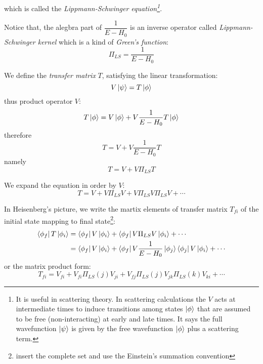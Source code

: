\documentclass[12pt,openany]{book}
\begin{document}
	which is called the \textit{Lippmann-Schwinger equation\footnote{It is useful in scattering theory. In scattering calculations the $V$ acts at intermediate times to induce transitions among states $\ket{\phi}$ that are assumed to be free (non-interacting) at early and late times. It says the full wavefunction $\ket{\psi}$ is given by the free wavefunction $\ket{\phi}$ plus a scattering term.}}.\par 
	Notice that, the alegbra part of $\dfrac{1}{E-H_0}$ is an inverse operator called \textit{Lippmann-Schwinger kernel} which
	is a kind of \textit{Green's function}:
	\begin{equation}
		\Pi_{LS}=\frac{1}{E-H_0}
	\end{equation}\par 
	We define the \textit{transfer matrix} $T$, satisfying the linear transformation:
	\begin{equation}
		V\ket{\psi}=T\ket{\phi}
	\end{equation}
	thus product operator $V$:
	\begin{equation*}
		T\ket{\phi}=V\ket{\phi}+V\frac{1}{E-H_0}T\ket{\phi}
	\end{equation*}
	therefore
	\begin{equation}
		T=V+V\frac{1}{E-H_0}T
	\end{equation}
	namely
	\begin{equation}
		T=V+V\Pi_{LS}T
	\end{equation}\par 
	We expand the equation in order by $V$:
	\begin{equation}
		T=V+V\Pi_{LS}V+V\Pi_{LS}V\Pi_{LS}V+\cdots
	\end{equation}\par 
	In Heisenberg's picture, we write the martix elements of transfer matrix $T_{fi}$ of the initial state mapping to final state\footnote{insert the complete set and use the Einstein's summation convention}:
	\begin{equation}
		\begin{aligned}
			\bra{\phi_f}T\ket{\phi_i}&=\bra{\phi_f}V\ket{\phi_i}+\bra{\phi_f}V\Pi_{LS}V\ket{\phi_i}+\cdots \\
			&=\bra{\phi_f}V\ket{\phi_i}+\bra{\phi_f}V\frac{1}{E-H_0}\ket{\phi_j}\bra{\phi_j}V\ket{\phi_i}+\cdots
		\end{aligned}
	\end{equation}
	or the matrix product form:
	\begin{equation}
		T_{fi}=V_{fi}+V_{fi}\Pi_{LS}(j)V_{ji}+V_{fj}\Pi_{LS}(j)V_{jk}\Pi_{LS}(k)V_{ki}+\cdots
	\end{equation}
\end{document}
